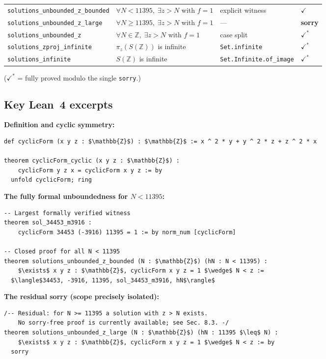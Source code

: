 \documentclass[12pt,a4paper]{article}
\theoremstyle{definition}
\newcommand{\Z}{\mathbb{Z}}
\begin{document}
\begin{table}[h]
\begin{tabular}{p{5.0cm}p{5.0cm}p{2.2cm}p{1.5cm}}
\texttt{solutions\_unbounded\_z\_bounded} & $\forall N<11395,\;\exists z>N$ with $f=1$ & explicit witness & $\checkmark$ \\
\texttt{solutions\_unbounded\_z\_large} & $\forall N\ge11395,\;\exists z>N$ with $f=1$ & — & \textbf{sorry} \\
\texttt{solutions\_unbounded\_z} & $\forall N\in\Z,\;\exists z>N$ with $f=1$ & case split & $\checkmark^*$ \\
\texttt{solutions\_zproj\_infinite} & $\pi_z(S(\Z))$ is infinite & \texttt{Set.infinite} & $\checkmark^*$ \\
\texttt{solutions\_infinite} & $S(\Z)$ is infinite & \texttt{Set.Infinite.of\_image} & $\checkmark^*$ \\
\bottomrule
\end{tabular}
\end{table}

\noindent ($\checkmark^*$ = fully proved modulo the single \texttt{sorry}.)

\subsection{Key Lean~4 excerpts}

\noindent\textbf{Definition and cyclic symmetry:}
\begin{lstlisting}[language=Lean4]
def cyclicForm (x y z : $\mathbb{Z}$) : $\mathbb{Z}$ := x ^ 2 * y + y ^ 2 * z + z ^ 2 * x

theorem cyclicForm_cyclic (x y z : $\mathbb{Z}$) :
    cyclicForm y z x = cyclicForm x y z := by
  unfold cyclicForm; ring
\end{lstlisting}

\noindent\textbf{The fully formal unboundedness for $N < 11395$:}
\begin{lstlisting}[language=Lean4]
-- Largest formally verified witness
theorem sol_34453_m3916 :
    cyclicForm 34453 (-3916) 11395 = 1 := by norm_num [cyclicForm]

-- Closed proof for all N < 11395
theorem solutions_unbounded_z_bounded (N : $\mathbb{Z}$) (hN : N < 11395) :
    $\exists$ x y z : $\mathbb{Z}$, cyclicForm x y z = 1 $\wedge$ N < z :=
  $\langle$34453, -3916, 11395, sol_34453_m3916, hN$\rangle$
\end{lstlisting}

\noindent\textbf{The residual sorry (scope precisely isolated):}
\begin{lstlisting}[language=Lean4]
/-- Residual: for N >= 11395 a solution with z > N exists.
    No sorry-free proof is currently available; see Sec. 8.3. -/
theorem solutions_unbounded_z_large (N : $\mathbb{Z}$) (hN : 11395 $\leq$ N) :
    $\exists$ x y z : $\mathbb{Z}$, cyclicForm x y z = 1 $\wedge$ N < z := by
  sorry
\end{lstlisting}
\end{document}
